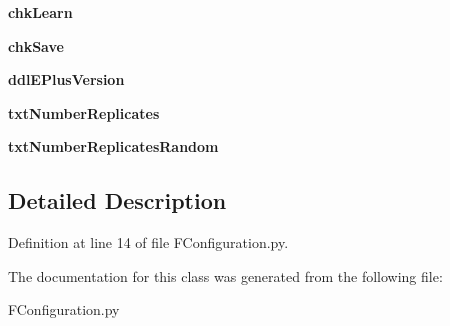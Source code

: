 \begin{DoxyCompactItemize}
\item 
\mbox{\label{class_f_configuration_1_1_frm_configuration_ae413b6d8d9c45f1720715a7b2542df1d}} 
{\bfseries chk\+Learn}
\item 
\mbox{\label{class_f_configuration_1_1_frm_configuration_a9a9e8283eef05e484fde00282079f7f3}} 
{\bfseries chk\+Save}
\item 
\mbox{\label{class_f_configuration_1_1_frm_configuration_a8eea02931fed24e1f07bda5d78b288a2}} 
{\bfseries ddl\+E\+Plus\+Version}
\item 
\mbox{\label{class_f_configuration_1_1_frm_configuration_a355d26c83acdd67f5885f477d030e417}} 
{\bfseries txt\+Number\+Replicates}
\item 
\mbox{\label{class_f_configuration_1_1_frm_configuration_a0738497e1097dbcec26eaa7a1d84d507}} 
{\bfseries txt\+Number\+Replicates\+Random}
\end{DoxyCompactItemize}


\subsection{Detailed Description}


Definition at line 14 of file F\+Configuration.\+py.



The documentation for this class was generated from the following file\+:\begin{DoxyCompactItemize}
\item 
F\+Configuration.\+py\end{DoxyCompactItemize}
